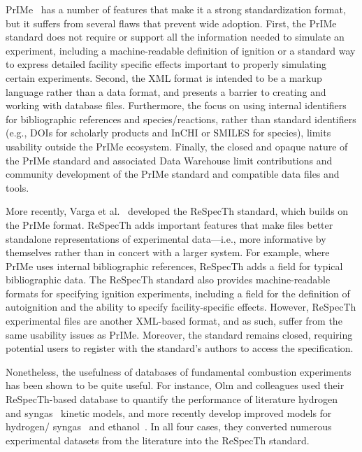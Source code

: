 \documentclass[12pt]{ussci}
\begin{document}
PrIMe~\autocite{Frenklach:2007bm,You:2011hy} has a number of features that make
it a strong standardization format, but it suffers from several flaws that
prevent wide adoption. First, the PrIMe standard does not require or support all
the information needed to simulate an experiment, including a machine-readable
definition of ignition or a standard way to express detailed facility specific
effects important to properly simulating certain experiments. Second, the XML
format is intended to be a markup language rather than a data format, and
presents a barrier to creating and working with database files. Furthermore, the
focus on using internal identifiers for bibliographic references and
species\slash reactions, rather than standard identifiers (e.g., DOIs for
scholarly products and InCHI or SMILES for species), limits usability outside
the PrIMe ecosystem. Finally, the closed and opaque nature of the PrIMe standard
and associated Data Warehouse limit contributions and community development of
the PrIMe standard and compatible data files and tools.

More recently, Varga et al.~\autocite{Varga2015a,Varga2015b} developed the
ReSpecTh standard, which builds on the PrIMe format. ReSpecTh adds important
features that make files better standalone representations of experimental
data---i.e., more informative by themselves rather than in concert with a larger
system. For example, where PrIMe uses internal bibliographic references,
ReSpecTh adds a field for typical bibliographic data. The ReSpecTh standard also
provides machine-readable formats for specifying ignition experiments, including
a field for the definition of autoignition and the ability to specify
facility-specific effects. However, ReSpecTh experimental files are another
XML-based format, and as such, suffer from the same usability issues as PrIMe.
Moreover, the standard remains closed, requiring potential users to register
with the standard's authors to access the specification.

Nonetheless, the usefulness of databases of fundamental combustion experiments
has been shown to be quite useful. For instance, Olm and colleagues used their
ReSpecTh-based database to quantify the performance of literature
hydrogen~\autocite{Olm:2014gn} and syngas~\autocite{Olm:2015ch} kinetic models,
and more recently develop improved models for hydrogen\slash
syngas~\autocite{Varga:2016gj} and ethanol~\autocite{Olm:2016et}. In all four
cases, they converted numerous experimental datasets from the literature into
the ReSpecTh standard.
\end{document}
